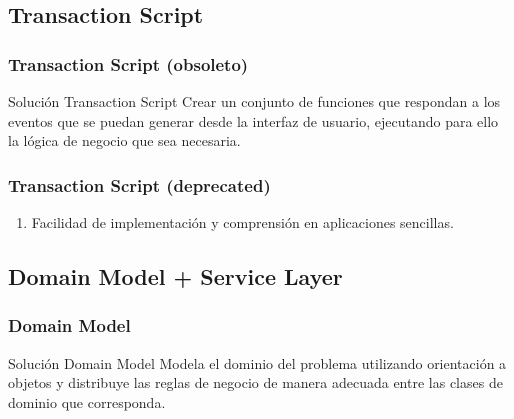 \documentclass[a4paper,slidestop,xcolor=pst,dvips,blue]{beamer}
\begin{document}
\subsection{Transaction Script}

\begin{frame}[c]
    \frametitle{Transaction Script (obsoleto)}
    \begin{block}{Solución Transaction Script}
        Crear un conjunto de funciones que respondan a los eventos que se puedan generar 
        desde la interfaz de usuario, ejecutando para ello la lógica de negocio que sea necesaria.
    \end{block}
\end{frame}

\begin{frame}[c]
    \frametitle{Transaction Script (deprecated)}
    \begin{enumerate}
        \item<2-> Facilidad de implementación y comprensión en aplicaciones sencillas.
    \end{enumerate}
\end{frame}

\subsection{Domain Model + Service Layer}

\begin{frame}[c]
    \frametitle{Domain Model}
    \begin{block}{Solución Domain Model}
        Modela el dominio del problema utilizando orientación a objetos y distribuye las reglas de negocio de manera adecuada entre las clases de dominio que corresponda.
    \end{block}
\end{frame}
\end{document}
